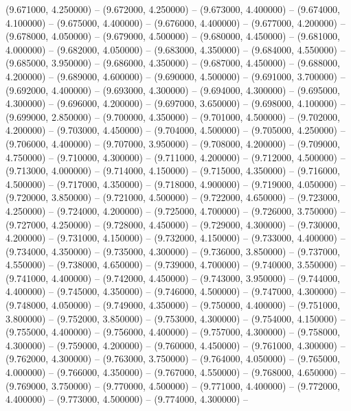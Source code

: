 (9.671000, 4.250000) -- 
(9.672000, 4.250000) -- 
(9.673000, 4.400000) -- 
(9.674000, 4.100000) -- 
(9.675000, 4.400000) -- 
(9.676000, 4.400000) -- 
(9.677000, 4.200000) -- 
(9.678000, 4.050000) -- 
(9.679000, 4.500000) -- 
(9.680000, 4.450000) -- 
(9.681000, 4.000000) -- 
(9.682000, 4.050000) -- 
(9.683000, 4.350000) -- 
(9.684000, 4.550000) -- 
(9.685000, 3.950000) -- 
(9.686000, 4.350000) -- 
(9.687000, 4.450000) -- 
(9.688000, 4.200000) -- 
(9.689000, 4.600000) -- 
(9.690000, 4.500000) -- 
(9.691000, 3.700000) -- 
(9.692000, 4.400000) -- 
(9.693000, 4.300000) -- 
(9.694000, 4.300000) -- 
(9.695000, 4.300000) -- 
(9.696000, 4.200000) -- 
(9.697000, 3.650000) -- 
(9.698000, 4.100000) -- 
(9.699000, 2.850000) -- 
(9.700000, 4.350000) -- 
(9.701000, 4.500000) -- 
(9.702000, 4.200000) -- 
(9.703000, 4.450000) -- 
(9.704000, 4.500000) -- 
(9.705000, 4.250000) -- 
(9.706000, 4.400000) -- 
(9.707000, 3.950000) -- 
(9.708000, 4.200000) -- 
(9.709000, 4.750000) -- 
(9.710000, 4.300000) -- 
(9.711000, 4.200000) -- 
(9.712000, 4.500000) -- 
(9.713000, 4.000000) -- 
(9.714000, 4.150000) -- 
(9.715000, 4.350000) -- 
(9.716000, 4.500000) -- 
(9.717000, 4.350000) -- 
(9.718000, 4.900000) -- 
(9.719000, 4.050000) -- 
(9.720000, 3.850000) -- 
(9.721000, 4.500000) -- 
(9.722000, 4.650000) -- 
(9.723000, 4.250000) -- 
(9.724000, 4.200000) -- 
(9.725000, 4.700000) -- 
(9.726000, 3.750000) -- 
(9.727000, 4.250000) -- 
(9.728000, 4.450000) -- 
(9.729000, 4.300000) -- 
(9.730000, 4.200000) -- 
(9.731000, 4.150000) -- 
(9.732000, 4.150000) -- 
(9.733000, 4.400000) -- 
(9.734000, 4.350000) -- 
(9.735000, 4.300000) -- 
(9.736000, 3.850000) -- 
(9.737000, 4.550000) -- 
(9.738000, 4.650000) -- 
(9.739000, 4.700000) -- 
(9.740000, 3.550000) -- 
(9.741000, 4.400000) -- 
(9.742000, 4.450000) -- 
(9.743000, 3.950000) -- 
(9.744000, 4.400000) -- 
(9.745000, 4.350000) -- 
(9.746000, 4.500000) -- 
(9.747000, 4.300000) -- 
(9.748000, 4.050000) -- 
(9.749000, 4.350000) -- 
(9.750000, 4.400000) -- 
(9.751000, 3.800000) -- 
(9.752000, 3.850000) -- 
(9.753000, 4.300000) -- 
(9.754000, 4.150000) -- 
(9.755000, 4.400000) -- 
(9.756000, 4.400000) -- 
(9.757000, 4.300000) -- 
(9.758000, 4.300000) -- 
(9.759000, 4.200000) -- 
(9.760000, 4.450000) -- 
(9.761000, 4.300000) -- 
(9.762000, 4.300000) -- 
(9.763000, 3.750000) -- 
(9.764000, 4.050000) -- 
(9.765000, 4.000000) -- 
(9.766000, 4.350000) -- 
(9.767000, 4.550000) -- 
(9.768000, 4.650000) -- 
(9.769000, 3.750000) -- 
(9.770000, 4.500000) -- 
(9.771000, 4.400000) -- 
(9.772000, 4.400000) -- 
(9.773000, 4.500000) -- 
(9.774000, 4.300000) -- 
